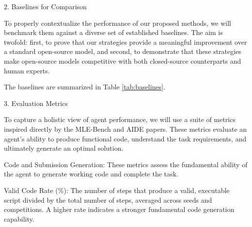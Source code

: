 2. Baselines for Comparison

To properly contextualize the performance of our proposed methods, we will benchmark them against a diverse set of established baselines. The aim is twofold: first, to prove that our strategies provide a meaningful improvement over a standard open-source model, and second, to demonstrate that these strategies make open-source models competitive with both closed-source counterparts and human experts.

The baselines are summarized in Table \ref{tab:baselines}.


3. Evaluation Metrics

To capture a holistic view of agent performance, we will use a suite of metrics inspired directly by the MLE-Bench and AIDE papers. These metrics evaluate an agent's ability to produce functional code, understand the task requirements, and ultimately generate an optimal solution.

Code and Submission Generation: These metrics assess the fundamental ability of the agent to generate working code and complete the task.

Valid Code Rate (\%): The number of steps that produce a valid, executable script divided by the total number of steps, averaged across seeds and competitions. A higher rate indicates a stronger fundamental code generation capability.

